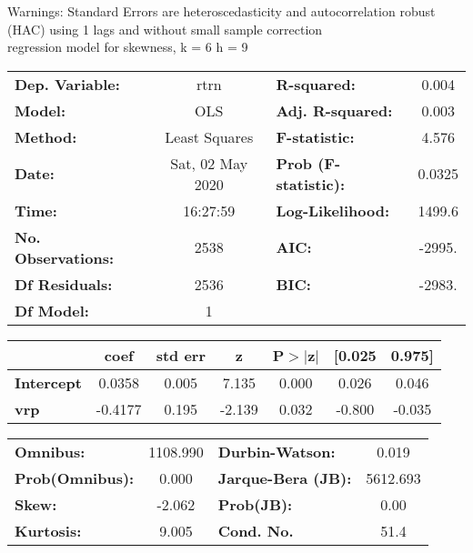 Warnings: \newline
 [1] Standard Errors are heteroscedasticity and autocorrelation robust (HAC) using 1 lags and without small sample correction\\ 

regression model for skewness, k = 6 h = 9\begin{center}
\begin{tabular}{lclc}
\toprule
\textbf{Dep. Variable:}    &       rtrn       & \textbf{  R-squared:         } &     0.004   \\
\textbf{Model:}            &       OLS        & \textbf{  Adj. R-squared:    } &     0.003   \\
\textbf{Method:}           &  Least Squares   & \textbf{  F-statistic:       } &     4.576   \\
\textbf{Date:}             & Sat, 02 May 2020 & \textbf{  Prob (F-statistic):} &   0.0325    \\
\textbf{Time:}             &     16:27:59     & \textbf{  Log-Likelihood:    } &    1499.6   \\
\textbf{No. Observations:} &        2538      & \textbf{  AIC:               } &    -2995.   \\
\textbf{Df Residuals:}     &        2536      & \textbf{  BIC:               } &    -2983.   \\
\textbf{Df Model:}         &           1      & \textbf{                     } &             \\
\bottomrule
\end{tabular}
\begin{tabular}{lcccccc}
                   & \textbf{coef} & \textbf{std err} & \textbf{z} & \textbf{P$> |$z$|$} & \textbf{[0.025} & \textbf{0.975]}  \\
\midrule
\textbf{Intercept} &       0.0358  &        0.005     &     7.135  &         0.000        &        0.026    &        0.046     \\
\textbf{vrp}       &      -0.4177  &        0.195     &    -2.139  &         0.032        &       -0.800    &       -0.035     \\
\bottomrule
\end{tabular}
\begin{tabular}{lclc}
\textbf{Omnibus:}       & 1108.990 & \textbf{  Durbin-Watson:     } &    0.019  \\
\textbf{Prob(Omnibus):} &   0.000  & \textbf{  Jarque-Bera (JB):  } & 5612.693  \\
\textbf{Skew:}          &  -2.062  & \textbf{  Prob(JB):          } &     0.00  \\
\textbf{Kurtosis:}      &   9.005  & \textbf{  Cond. No.          } &     51.4  \\
\bottomrule
\end{tabular}
\end{center}

